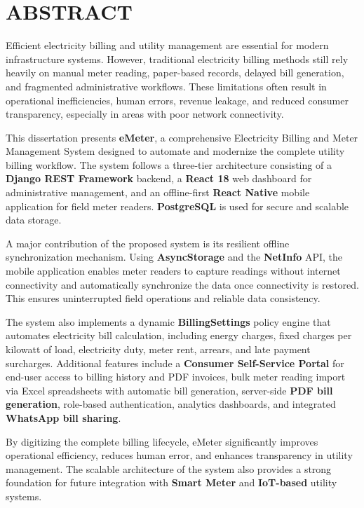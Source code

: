 \documentclass[12pt, a4paper, onecolumn]{report}
\begin{document}
\newpage
\tableofcontents
\listoffigures
\listoftables

\newpage
\chapter*{ABSTRACT}

Efficient electricity billing and utility management are essential for modern infrastructure systems. However, traditional electricity billing methods still rely heavily on manual meter reading, paper-based records, delayed bill generation, and fragmented administrative workflows. These limitations often result in operational inefficiencies, human errors, revenue leakage, and reduced consumer transparency, especially in areas with poor network connectivity.

This dissertation presents \textbf{eMeter}, a comprehensive Electricity Billing and Meter Management System designed to automate and modernize the complete utility billing workflow. The system follows a three-tier architecture consisting of a \textbf{Django REST Framework} backend, a \textbf{React 18} web dashboard for administrative management, and an offline-first \textbf{React Native} mobile application for field meter readers. \textbf{PostgreSQL} is used for secure and scalable data storage.

A major contribution of the proposed system is its resilient offline synchronization mechanism. Using \textbf{AsyncStorage} and the \textbf{NetInfo} API, the mobile application enables meter readers to capture readings without internet connectivity and automatically synchronize the data once connectivity is restored. This ensures uninterrupted field operations and reliable data consistency.

The system also implements a dynamic \textbf{BillingSettings} policy engine that automates electricity bill calculation, including energy charges, fixed charges per kilowatt of load, electricity duty, meter rent, arrears, and late payment surcharges. Additional features include a \textbf{Consumer Self-Service Portal} for end-user access to billing history and PDF invoices, bulk meter reading import via Excel spreadsheets with automatic bill generation, server-side \textbf{PDF bill generation}, role-based authentication, analytics dashboards, and integrated \textbf{WhatsApp bill sharing}.

By digitizing the complete billing lifecycle, eMeter significantly improves operational efficiency, reduces human error, and enhances transparency in utility management. The scalable architecture of the system also provides a strong foundation for future integration with \textbf{Smart Meter} and \textbf{IoT-based} utility systems.

\clearpage
{}
\end{document}
